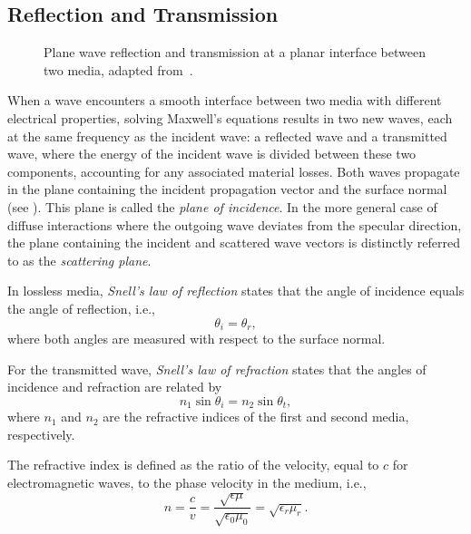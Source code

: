 \subsection{Reflection and Transmission}

\begin{figure}
  \centering
  \caption{Plane wave reflection and transmission at a planar interface between two media, adapted from~\cite[Fig.~3.1]{Saunders2024}.}
\end{figure}

When a wave encounters a smooth interface between two media with different electrical properties, solving Maxwell's equations results in two new waves, each at the same frequency as the incident wave: a reflected wave and a transmitted wave, where the energy of the incident wave is divided between these two components, accounting for any associated material losses. Both waves propagate in the plane containing the incident propagation vector and the surface normal (see ). This plane is called the \emph{plane of incidence}. In the more general case of diffuse interactions where the outgoing wave deviates from the specular direction, the plane containing the incident and scattered wave vectors is distinctly referred to as the \emph{scattering plane}.

In lossless media, \emph{Snell's law of reflection} states that the angle of incidence equals the angle of reflection, i.e.,
\begin{equation}\label{eq:snell-reflection}
  \theta_i = \theta_r,
\end{equation}
where both angles are measured with respect to the surface normal.

For the transmitted wave, \emph{Snell's law of refraction} states that the angles of incidence and refraction are related by
\begin{equation}\label{eq:snell-refraction}
  n_1 \sin \theta_i = n_2 \sin \theta_t,
\end{equation}
where $n_1$ and $n_2$ are the refractive indices of the first and second media, respectively.

The refractive index is defined as the ratio of the  velocity, equal to $c$ for electromagnetic waves, to the phase velocity in the medium, i.e.,
\begin{equation}
  n = \frac{c}{v} = \frac{\sqrt{\epsilon \mu}}{\sqrt{\epsilon_0 \mu_0}} = \sqrt{\epsilon_r \mu_r}.
\end{equation}

